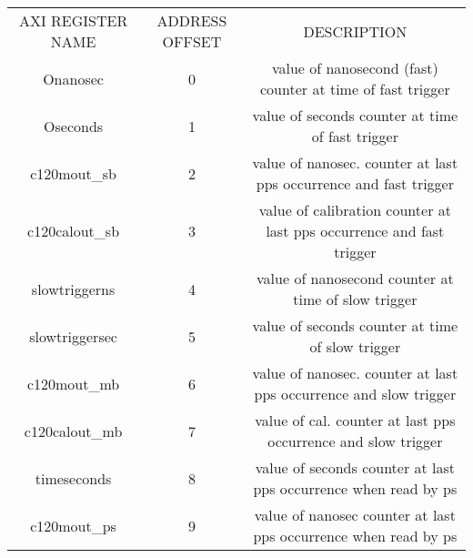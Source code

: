 \begin{table}
\begin{center}
%
\begin{tiny}
\begin{tabular}{c c c}
AXI REGISTER NAME&ADDRESS OFFSET& DESCRIPTION \\
Onanosec&0 &value of nanosecond (fast) counter at time of fast trigger \\
Oseconds&1 &value of seconds counter at time of fast trigger \\
c120mout\_sb&2& value of nanosec. counter at last pps occurrence and fast trigger \\
c120calout\_sb&3&value of calibration counter at last pps occurrence and fast trigger \\
slowtriggerns&4&value of nanosecond counter at time of slow trigger \\
slowtriggersec&5&value of seconds counter at time of slow trigger \\
c120mout\_mb&6&value of nanosec.  counter at last pps occurrence and slow trigger \\
c120calout\_mb&7&value of cal. counter at last pps occurrence and slow trigger \\
timeseconds&8&value of seconds  counter at last pps occurrence when read by ps \\
c120mout\_ps&9&value of nanosec counter at last pps occurrence when read by ps \\

\end{tabular}
\end{tiny}
\end{center}
\end{table}
